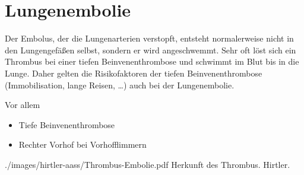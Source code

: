 % 
%   
%   
%   

{
}{}{}{}{}


\section{Lungenembolie}
\label{topic:lungenembolie}



{%
Der Embolus, der die Lungenarterien verstopft, entsteht
normalerweise nicht in den Lungengefäßen selbst, sondern er
wird angeschwemmt. Sehr oft löst sich ein Thrombus bei
einer tiefen Beinvenenthrombose und schwimmt im Blut bis in
die Lunge. Daher gelten die
Risikofaktoren der tiefen Beinvenenthrombose
(Immobilisation, lange Reisen, \ldots) auch bei der
Lungenembolie. 
}{
Vor allem
\begin{itemize}
  \item Tiefe Beinvenenthrombose
  \item Rechter Vorhof bei Vorhofflimmern
\end{itemize}
}
{./images/hirtler-aass/Thrombus-Embolie.pdf}
{Herkunft des Thrombus.}
{Hirtler.}



